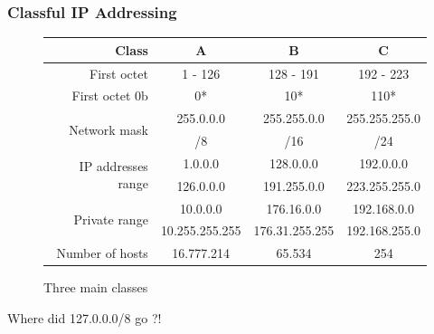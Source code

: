   \begin{frame}
    \frametitle{Classful IP Addressing}
    \begin{figure}
      \centering
      \resizebox{11.5cm}{!} {
	\begin{tabular}{|r||c|c|c|}
	  \hline
	  Class & A & B & C \\ \hline \hline
	  First octet & {\color{ForestGreen}1} - {\color{ForestGreen}126} & {\color{ForestGreen}128} - {\color{ForestGreen}191} & {\color{ForestGreen}192} - {\color{ForestGreen}223} \\ \hline
	  First octet 0b& {\color{ForestGreen}0*} & {\color{ForestGreen}10*} & {\color{ForestGreen}110*} \\ \hline
	  \multirow{2}{*}{\color{brown}Network mask} & {\color{brown}255}.{\color{fuchsia}0.0.0} & {\color{brown}255.255}.{\color{fuchsia}0.0} & {\color{brown}255.255.255}.{\color{fuchsia}0}\\
	  & {\color{brown}/8} & {\color{brown}/16} & {\color{brown}/24} \\ \hline
	  \multirow{2}{*}{IP addresses range} & {\color{ForestGreen}1}.{\color{blue}0.0.0} & {\color{ForestGreen}128.0}.{\color{blue}0.0} & {\color{ForestGreen}192.0.0}.{\color{blue}0}\\
	  & {\color{ForestGreen}126}.{\color{blue}0.0.0} & {\color{ForestGreen}191.255}.{\color{blue}0.0} & {\color{ForestGreen}223.255.255}.{\color{blue}0} \\ \hline
	  \multirow{2}{*}{Private range}
	  & {\color{ForestGreen}10}.{\color{blue}0.0.0} 	    & {\color{ForestGreen}176.16}.{\color{blue}0.0}     & {\color{ForestGreen}192.168.0}.{\color{blue}0}\\
	  & {\color{ForestGreen}10}.{\color{blue}255.255.255} & {\color{ForestGreen}176.31}.{\color{blue}255.255} & {\color{ForestGreen}192.168.255}.{\color{blue}0} \\ \hline
	  Number of {\color{blue}hosts} & 16.777.214 & 65.534 & 254 \\ \hline
	\end{tabular}
      }
      \caption{Three main classes}
    \end{figure}
    Where did {\color{ForestGreen}127}.{\color{blue}0.0.0}{\color{brown}/8} go ?!
  \end{frame}

